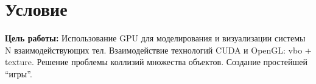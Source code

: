 \section{Условие}
\textbf{Цель работы:} Использование GPU для моделирования и визуализации системы N взаимодействующих тел. Взаимодействие технологий CUDA и OpenGL: vbo + texture. Решение проблемы коллизий множества объектов. Создание простейшей \enquote{игры}.
